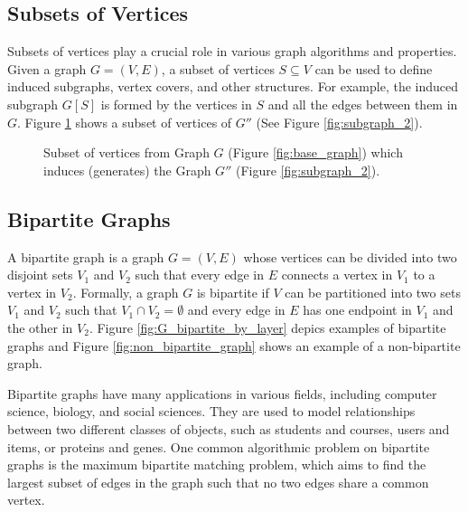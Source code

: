         \subsection{Subsets of Vertices}
        
            Subsets of vertices play a crucial role in various graph algorithms and properties\cite{cormen, bondy1976graph}. Given a graph \( G = (V, E) \), a subset of vertices \( S \subseteq V \) can be used to define induced subgraphs, vertex covers, and other structures. For example, the induced subgraph \( G[S] \) is formed by the vertices in \( S \) and all the edges between them in \( G \). Figure \ref{fig:subset_of_vertices} shows a subset of vertices of $G''$ (See Figure \ref{fig:subgraph_2}).

            \begin{figure}[!ht]
                \centering
                \caption{Subset of vertices from Graph $G$ (Figure \ref{fig:base_graph}) which induces (generates) the Graph $G''$ (Figure \ref{fig:subgraph_2}).}
                \label{fig:subset_of_vertices}
            \end{figure}


        \subsection{Bipartite Graphs}

            A bipartite graph is a graph \( G = (V, E) \) whose vertices can be divided into two disjoint sets \( V_1 \) and \( V_2 \) such that every edge in \( E \) connects a vertex in \( V_1 \) to a vertex in \( V_2 \)\cite{cormen, bondy1976graph}.
            Formally, a graph \( G \) is bipartite if \( V \) can be partitioned into two sets \( V_1 \) and \( V_2 \) such that \( V_1 \cap V_2 = \emptyset \) and every edge in \( E \) has one endpoint in \( V_1 \) and the other in \( V_2 \). Figure \ref{fig:G_bipartite_by_layer} depics examples of bipartite graphs and Figure \ref{fig:non_bipartite_graph} shows an example of a non-bipartite graph.
            
            Bipartite graphs have many applications in various fields, including computer science, biology, and social sciences. They are used to model relationships between two different classes of objects, such as students and courses, users and items, or proteins and genes. One common algorithmic problem on bipartite graphs is the maximum bipartite matching problem, which aims to find the largest subset of edges in the graph such that no two edges share a common vertex.
            
